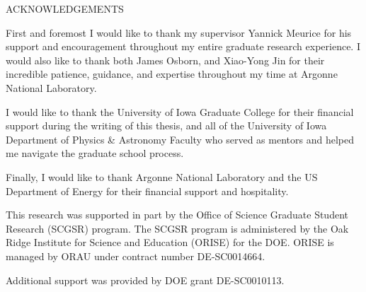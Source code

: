 \begin{doublespace}
\begin{tightcenter}
ACKNOWLEDGEMENTS
\mylinespacing%
\end{tightcenter}

First and foremost I would like to thank my supervisor Yannick Meurice for his
support and encouragement throughout my entire graduate research experience.
%
I would also like to thank both James Osborn, and Xiao-Yong Jin for their
incredible patience, guidance, and expertise throughout my time at Argonne
National Laboratory.

I would like to thank the University of Iowa Graduate College for their
financial support during the writing of this thesis, and all of the University
of Iowa Department of Physics \& Astronomy Faculty who served as mentors and
helped me navigate the graduate school process.

Finally, I would like to thank Argonne National Laboratory and the US
Department of Energy for their financial support and hospitality.

This research was supported in part by the Office of Science Graduate Student
Research (SCGSR) program. The SCGSR program is administered by the Oak Ridge
Institute for Science and Education (ORISE) for the DOE. ORISE is managed by
ORAU under contract number DE‐SC0014664.

Additional support was provided by DOE grant DE-SC0010113.





\end{doublespace}
